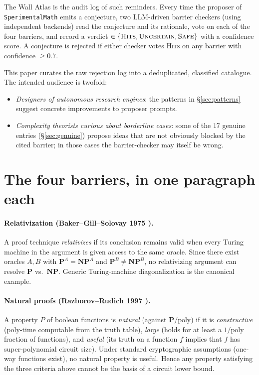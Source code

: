 \documentclass[11pt,a4paper]{article}
\begin{document}
The Wall Atlas is the audit log of such reminders. Every time the
proposer of \texttt{SperimentalMath} emits a conjecture, two
LLM-driven barrier checkers (using independent backends) read the
conjecture and its rationale, vote on each of the four barriers, and
record a verdict $\in \{\textsc{Hits}, \textsc{Uncertain}, \textsc{Safe}\}$
with a confidence score. A conjecture is rejected if either checker
votes \textsc{Hits} on any barrier with confidence $\geq 0.7$.

This paper curates the raw rejection log into a deduplicated, classified
catalogue. The intended audience is twofold:

\begin{itemize}
\item \emph{Designers of autonomous research engines}: the patterns
in \S\ref{sec:patterns} suggest concrete improvements to proposer
prompts.
\item \emph{Complexity theorists curious about borderline cases}:
some of the $17$ genuine entries (\S\ref{sec:genuine}) propose ideas
that are not obviously blocked by the cited barrier; in those cases
the barrier-checker may itself be wrong.
\end{itemize}

\section{The four barriers, in one paragraph each}\label{sec:barriers}

\paragraph{Relativization (Baker--Gill--Solovay 1975 \cite{BakerGillSolovay1975}).}
A proof technique \emph{relativizes} if its conclusion remains valid
when every Turing machine in the argument is given access to the same
oracle. Since there exist oracles $A, B$ with $\mathbf{P}^A = \mathbf{NP}^A$ and
$\mathbf{P}^B \neq \mathbf{NP}^B$, no relativizing argument can resolve
$\mathbf{P}$ vs.\ $\mathbf{NP}$. Generic Turing-machine diagonalization is the
canonical example.

\paragraph{Natural proofs (Razborov--Rudich 1997 \cite{RazborovRudich1997}).}
A property $P$ of boolean functions is \emph{natural} (against
$\mathbf{P}/\mathrm{poly}$) if it is \emph{constructive} (poly-time
computable from the truth table), \emph{large} (holds for at least a
$1/\mathrm{poly}$ fraction of functions), and \emph{useful} (its truth
on a function $f$ implies that $f$ has super-polynomial circuit size).
Under standard cryptographic assumptions (one-way functions exist), no
natural property is useful. Hence any property satisfying the three
criteria above cannot be the basis of a circuit lower bound.
\end{document}
